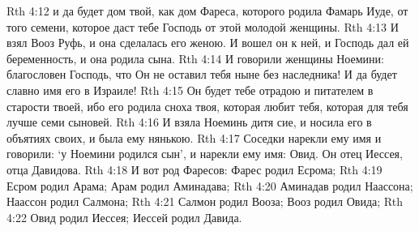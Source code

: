 Rth 4:12  и да будет дом твой, как дом Фареса, которого родила Фамарь Иуде, от того семени, которое даст тебе Господь от этой молодой женщины.
Rth 4:13  И взял Вооз Руфь, и она сделалась его женою. И вошел он к ней, и Господь дал ей беременность, и она родила сына.
Rth 4:14  И говорили женщины Ноемини: благословен Господь, что Он не оставил тебя ныне без наследника! И да будет славно имя его в Израиле!
Rth 4:15  Он будет тебе отрадою и питателем в старости твоей, ибо его родила сноха твоя, которая любит тебя, которая для тебя лучше семи сыновей.
Rth 4:16  И взяла Ноеминь дитя сие, и носила его в объятиях своих, и была ему нянькою.
Rth 4:17  Соседки нарекли ему имя и говорили: `у Ноемини родился сын', и нарекли ему имя: Овид. Он отец Иессея, отца Давидова.
Rth 4:18  И вот род Фаресов: Фарес родил Есрома;
Rth 4:19  Есром родил Арама; Арам родил Аминадава;
Rth 4:20  Аминадав родил Наассона; Наассон родил Салмона;
Rth 4:21  Салмон родил Вооза; Вооз родил Овида;
Rth 4:22  Овид родил Иессея; Иессей родил Давида.


